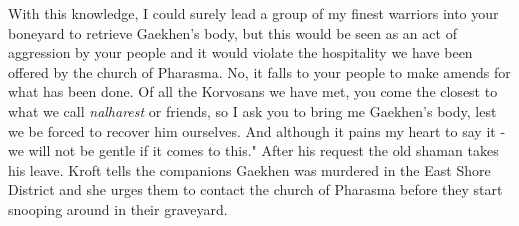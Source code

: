 With this knowledge, I could surely lead a group of my finest warriors into your boneyard to retrieve Gaekhen's body, but this would be seen as an act of aggression by your people and it would violate the hospitality we have been offered by the church of Pharasma. No, it falls to your people to make amends for what has been done. Of all the Korvosans we have met, you come the closest to what we call {\itshape nalharest} or friends, so I ask you to bring me Gaekhen's body, lest we be forced to recover him ourselves. And although it pains my heart to say it - we will not be gentle if it comes to this." After his request the old shaman takes his leave. Kroft tells the companions Gaekhen was murdered in the East Shore District and she urges them to contact the church of Pharasma before they start snooping around in their graveyard.\\

